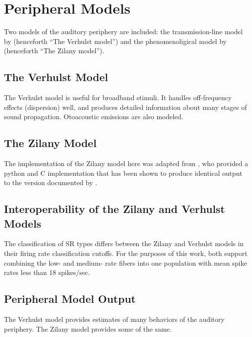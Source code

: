
\section{Peripheral Models} %
\label{sec:peripheral_models}
Two models of the auditory periphery are included: the transmission-line model by \cite{Verhulst2015Functional} (henceforth ``The Verhulst model'') and the phenomenoligical model by \cite{Zilany2014Updated} (henceforth ``The Zilany model'').

\subsection{The Verhulst Model} %
\label{sub:the_verhulst_model1}
The Verhulst model is useful for broadband stimuli.  It handles off-frequency effects (dispersion) well, and produces detailed information about many stages of sound propagation.  Otoacoustic emissions are also modeled. 
\subsection{The Zilany Model} %
\label{sub:the_zilany_model}
The implementation of the Zilany model here was adapted from \cite{Rudnicki2014Cochlea}, who provided a python and C implementation that has been shown to produce identical output to the version documented by \cite{Zilany2014Updated}. 

\subsection{Interoperability of the Zilany and Verhulst Models} %
\label{sub:interoperability_of_the_zilany_and_verhulst_models}
The classification of SR types differs between the Zilany and Verhulst models in their firing rate classification cutoffs.  For the purposes of this work, both support combining the low- and medium- rate fibers into one population with mean spike rates less than 18 spikes/sec.  

\subsection{Peripheral Model Output} %
\label{sub:peripheral_model_output}
The Verhulst model provides estimates of many behaviors of the auditory periphery.  The Zilany model provides some of the same. 


